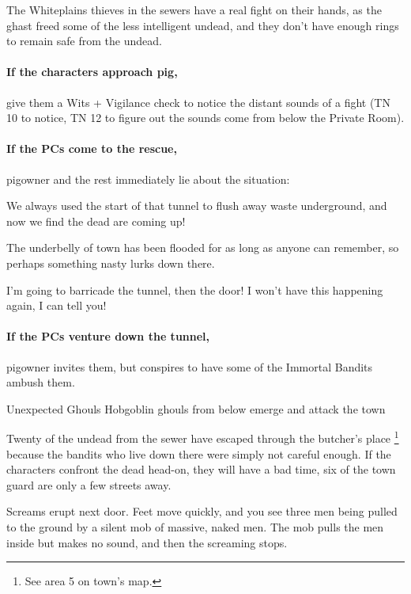 \begin{multicols}{2}
The Whiteplains thieves in the sewers have a real fight on their hands, as the ghast freed some of the less intelligent undead, and they don't have enough rings to remain safe from the undead.

\paragraph{If the characters approach \gls{pig},}
give them a Wits + Vigilance check  to notice the distant sounds of a fight (TN 10 to notice, TN 12 to figure out the sounds come from below the Private Room).

\paragraph{If the PCs come to the rescue,}
\gls{pigowner} and the rest immediately lie about the situation:

\begin{speechtext}
  We always used the start of that tunnel to flush away waste underground, and now we find the dead are coming up!

  The underbelly of \gls{town} has been flooded for as long as anyone can remember, so perhaps something nasty lurks down there.

  I'm going to barricade the tunnel, then the door!
  I won't have this happening again, I can tell you!
\end{speechtext}

\paragraph{If the PCs venture down the tunnel,}
\gls{pigowner} invites them, but conspires to have some of the Immortal Bandits ambush them.

{\N\N Unexpected Ghouls}%
{Hobgoblin ghouls from below emerge and attack the town}%

Twenty of the undead from the sewer have escaped through the butcher's place%
\footnote{See area 5 on \gls{town}'s map.}
because the bandits who live down there were simply not careful enough.
If the characters confront the dead head-on, they will have a bad time, six of the town guard are only a few streets away.

\begin{boxtext}

  Screams erupt next door.
  Feet move quickly, and you see three men being pulled to the ground by a silent mob of massive, naked men.
  The mob pulls the men inside but makes no sound, and then the screaming stops.


\end{boxtext}
\end{multicols}
